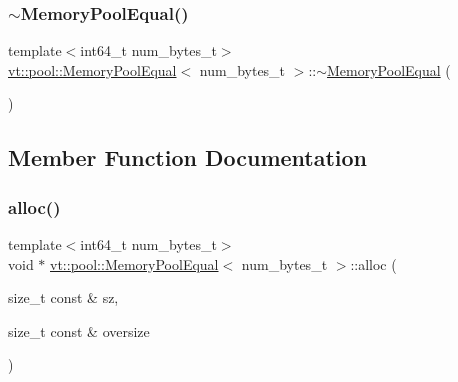 \mbox{\label{structvt_1_1pool_1_1_memory_pool_equal_a3639b62858bef876bf6f8a51cfdb7212}} 
\subsubsection{\texorpdfstring{$\sim$\+Memory\+Pool\+Equal()}{~MemoryPoolEqual()}}
{\footnotesize\ttfamily template$<$int64\+\_\+t num\+\_\+bytes\+\_\+t$>$ \\
\hyperlink{structvt_1_1pool_1_1_memory_pool_equal}{vt\+::pool\+::\+Memory\+Pool\+Equal}$<$ num\+\_\+bytes\+\_\+t $>$\+::$\sim$\hyperlink{structvt_1_1pool_1_1_memory_pool_equal}{Memory\+Pool\+Equal} (\begin{DoxyParamCaption}{ }\end{DoxyParamCaption})\hspace{0.3cm}{\ttfamily [virtual]}}



\subsection{Member Function Documentation}
\mbox{\label{structvt_1_1pool_1_1_memory_pool_equal_a070cb7e7f56cde226fe95a71832d7deb}} 
\subsubsection{\texorpdfstring{alloc()}{alloc()}}
{\footnotesize\ttfamily template$<$int64\+\_\+t num\+\_\+bytes\+\_\+t$>$ \\
void $\ast$ \hyperlink{structvt_1_1pool_1_1_memory_pool_equal}{vt\+::pool\+::\+Memory\+Pool\+Equal}$<$ num\+\_\+bytes\+\_\+t $>$\+::alloc (\begin{DoxyParamCaption}\item[{size\+\_\+t const \&}]{sz,  }\item[{size\+\_\+t const \&}]{oversize }\end{DoxyParamCaption})}


